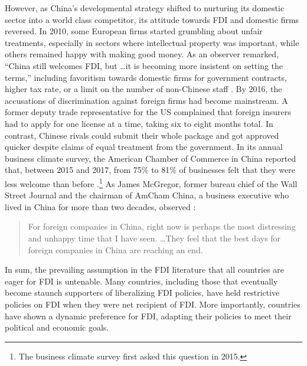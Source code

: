 However, as China's developmental strategy shifted to nurturing its domestic
sector into a world class competitor, its attitude towards FDI and domestic
firms reversed. In 2010, some European firms started grumbling about unfair
treatments, especially in sectors where intellectual property was important,
while others remained happy with making good money. As an observer remarked,
``China still welcomes FDI, but \ldots it is becoming more insistent on setting
the terms,'' including favoritism towards domestic firms for government
contracts, higher tax rate, or a limit on the number of non-Chinese staff
\citep{Grant2010}. By 2016, the accusations of discrimination against foreign
firms had become mainstream. A former deputy trade representative for the US
complained that foreign insurers had to apply for one license at a time, taking
six to eight months total. In contrast, Chinese rivals could submit their whole
package and got approved quicker despite claims of equal treatment from the
government. In its annual business climate survey, the American Chamber of
Commerce in China reported that, between 2015 and 2017, from 75\% to 81\% of
businesses felt that they were less welcome than before
\citep[39]{AmCham2018}.\footnote{The business climate survey first asked this
  question in 2015.} As James McGregor, former bureau chief of the Wall Street
Journal and the chairman of AmCham China, a business executive who lived in
China for more than two decades, observed \citep{Wu2016}:

\begin{quote}
  For foreign companies in China, right now is perhaps the most distressing and
  unhappy time that I have seen. \ldots They feel that the best days for foreign
  companies in China are reaching an end.
\end{quote}

In sum, the prevailing assumption in the FDI literature that all countries are eager
for FDI is untenable. Many countries, including those that eventually become staunch
supporters of liberalizing FDI policies, have held restrictive policies on FDI when
they were net recipient of FDI. More importantly, countries have shown a dynamic
preference for FDI, adapting their policies to meet their political and economic
goals.


